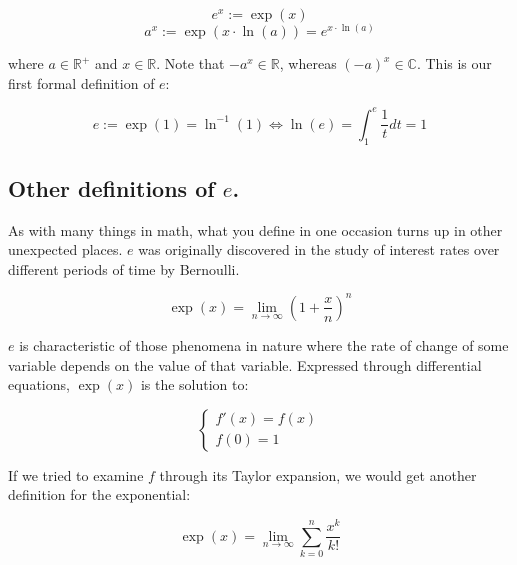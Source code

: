 $$e^x := \exp(x)$$
$$a^x := \exp(x\cdot \ln(a)) = e^{x\cdot \ln(a)}$$

where $a\in \mathbb{R}^+$ and $x\in \mathbb{R}$. Note that $-a^x \in \mathbb{R}$, whereas $(-a)^x \in \mathbb{C}$. This is our first formal definition of $e$:

$$e := \exp(1) = \ln^{-1}(1) \iff \ln(e) = \int_{1}^{e} \frac{1}{t} dt = 1$$

\subsection{Other definitions of $e$.}

As with many things in math, what you define in one occasion turns up in other unexpected places. $e$ was originally discovered in the study of interest rates over different periods of time by Bernoulli.

$$\exp(x) = \lim_{n \to \infty} \left(1 + \frac{x}{n}\right)^n$$

$e$ is characteristic of those phenomena in nature where the rate of change of some variable depends on the value of that variable. Expressed through differential equations, $\exp(x)$ is the solution to:

\begin{equation}
	\begin{cases}
		f'(x) = f(x) \\
		f(0) = 1
	\end{cases}
\end{equation}

If we tried to examine $f$ through its Taylor expansion, we would get another definition for the exponential:

$$\exp(x) = \lim_{n \to \infty} \sum\limits_{k = 0}^{n} \frac{x^k}{k!}$$

\newpage

